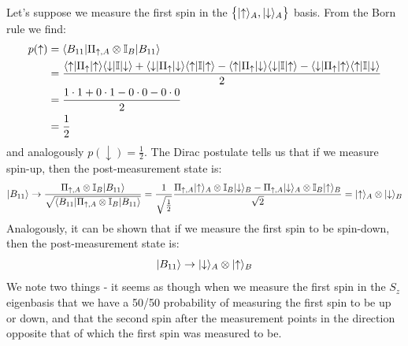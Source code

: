 Let's suppose we measure the first spin in the $\set{\lvert \uparrow \rangle_A, \lvert \downarrow \rangle_A}$ basis. From the Born rule we find:
\begin{equation}
    \begin{split}
        p(\uparrow) &= \langle B_{11} \rvert\Pi_{\uparrow, A} \otimes \mathbb{I}_B\lvert B_{11} \rangle 
        \\ &= \frac{\langle \uparrow \rvert\Pi_{\uparrow}\lvert \uparrow \rangle\langle \downarrow \rvert\mathbb{I}\lvert \downarrow \rangle + \langle \downarrow \rvert\Pi_{\uparrow}\lvert \downarrow \rangle\langle \uparrow \rvert\mathbb{I}\lvert \uparrow \rangle - \langle \uparrow \rvert\Pi_\uparrow \lvert \downarrow \rangle\langle \downarrow \rvert\mathbb{I}\lvert \uparrow \rangle - \langle \downarrow \rvert\Pi_\uparrow \lvert \uparrow \rangle\langle \uparrow \rvert\mathbb{I}\lvert \downarrow \rangle}{2} 
        \\ &= \frac{1 \cdot 1 + 0 \cdot 1  - 0 \cdot 0 - 0 \cdot 0}{2} 
        \\ &= \frac{1}{2}
    \end{split}
\end{equation}
and analogously $p(\downarrow) = \frac{1}{2}$. The Dirac postulate tells us that if we measure spin-up, then the post-measurement state is:
\begin{equation}
    \lvert B_{11} \rangle \to \frac{\Pi_{\uparrow, A} \otimes \mathbb{I}_B\lvert B_{11} \rangle}{\sqrt{\langle B_{11} \rvert\Pi_{\uparrow, A} \otimes \mathbb{I}_B\lvert B_{11} \rangle}} = \frac{1}{\sqrt{\frac{1}{2}}} \frac{\Pi_{\uparrow, A}\lvert \uparrow \rangle_A \otimes \mathbb{I}_B\lvert \downarrow \rangle_B - \Pi_{\uparrow, A}\lvert \downarrow \rangle_A \otimes \mathbb{I}_B\lvert \uparrow \rangle_B}{\sqrt{2}} = \lvert \uparrow \rangle_A \otimes \lvert \downarrow \rangle_B
\end{equation}
Analogously, it can be shown that if we measure the first spin to be spin-down, then the post-measurement state is:
\begin{equation}
    \lvert B_{11} \rangle \to \lvert \downarrow \rangle_A \otimes \lvert \uparrow \rangle_B
\end{equation}
We note two things - it seems as though when we measure the first spin in the $S_z$ eigenbasis that we have a 50/50 probability of measuring the first spin to be up or down, and that the second spin after the measurement points in the direction opposite that of which the first spin was measured to be.

